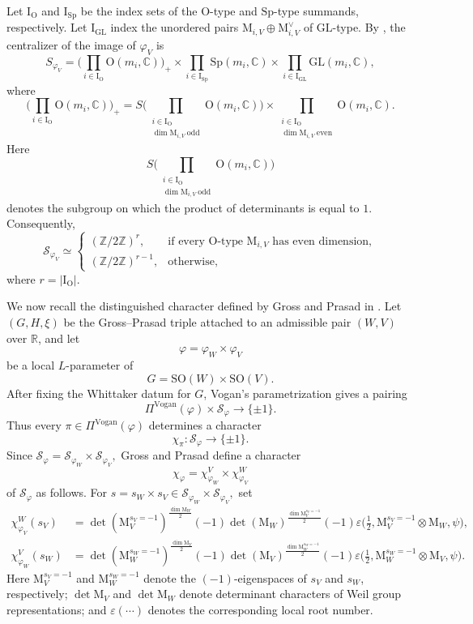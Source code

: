 \documentclass[12pt]{amsart}
\numberwithin{equation}{subsection}
\newcommand{\BC}{{\mathbb {C}}}
\newcommand{\BR}{{\mathbb {R}}}
\newcommand{\BZ}{{\mathbb {Z}}}
\newcommand{\CS}{{\mathcal {S}}}
\newcommand{\RI}{{\mathrm {I}}}
\newcommand{\RM}{{\mathrm {M}}}
\newcommand{\RO}{{\mathrm {O}}}
\newcommand{\GL}{{\mathrm{GL}}}
\newcommand{\SO}{{\mathrm{SO}}}
\newcommand{\Sp}{{\mathrm{Sp}}}
\def\veps{{\varepsilon}}
\def\vphi{\varphi}
\def\Vg{\mathrm{Vogan}}
\def\SO{\mathrm{SO}}
\begin{document}
Let $\RI_\RO$ and $\RI_\Sp$ be the index sets of the $\RO$-type and
$\Sp$-type summands, respectively. Let $\RI_\GL$ index the unordered pairs
$\RM_{i,V}\oplus \RM_{i,V}^\vee$ of $\GL$-type. By
\cite[Prop.~6.6, Prop.~7.7]{MR1186476}, the centralizer of the image of
$\vphi_V$ is
\begin{equation}\label{eq:SvphiVdescription}
S_{\vphi_V}
=
\bigg(
\prod_{i\in \RI_\RO}\RO(m_i,\BC)
\bigg)_+
\times
\prod_{i\in \RI_\Sp}\Sp(m_i,\BC)
\times
\prod_{i\in \RI_\GL}\GL(m_i,\BC),
\end{equation}
where
\[
\bigg(
\prod_{i\in \RI_\RO}\RO(m_i,\BC)
\bigg)_+
=
S\bigg(
\prod_{\substack{i\in \RI_\RO\\ \dim \RM_{i,V}\ \mathrm{odd}}}
\RO(m_i,\BC)
\bigg)
\times
\prod_{\substack{i\in \RI_\RO\\ \dim \RM_{i,V}\ \mathrm{even}}}
\RO(m_i,\BC).
\]
Here
\[
S\bigg(
\prod_{\substack{i\in \RI_\RO\\ \dim \RM_{i,V}\ \mathrm{odd}}}
\RO(m_i,\BC)
\bigg)
\]
denotes the subgroup on which the product of determinants is equal to $1$.
Consequently,
\begin{equation}\label{eq:component}
\CS_{\vphi_V}
\simeq
\begin{cases}
(\BZ/2\BZ)^r,
& \text{if every $\RO$-type $\RM_{i,V}$ has even dimension},\\
(\BZ/2\BZ)^{r-1},
& \text{otherwise},
\end{cases}
\end{equation}
where $r=|\RI_\RO|$.

We now recall the distinguished character defined by Gross and Prasad in
\cite[\S 10]{MR1186476}. Let $(G,H,\xi)$ be the Gross--Prasad triple attached
to an admissible pair $(W,V)$ over $\BR$, and let
\[
\vphi=\vphi_W\times \vphi_V
\]
be a local $L$-parameter of
\[
G=\SO(W)\times \SO(V).
\]
After fixing the Whittaker datum for $G$, Vogan's parametrization gives a
pairing
\[
\Pi^{\Vg}(\vphi)\times \CS_\vphi\to \{\pm 1\}.
\]
Thus every $\pi\in \Pi^{\Vg}(\vphi)$ determines a character
\[
\chi_\pi:\CS_\vphi\to \{\pm 1\}.
\]
Since
$
\CS_\vphi=\CS_{\vphi_W}\times \CS_{\vphi_V},
$
Gross and Prasad define a character
\[
\chi_\vphi=\chi^V_{\vphi_W}\times \chi^W_{\vphi_V}
\]
of $\CS_\vphi$ as follows. For
$
s=s_W\times s_V\in \CS_{\vphi_W}\times \CS_{\vphi_V},
$
set
\begin{align}\label{eq:chivphicharacter:1}
\chi^W_{\vphi_V}(s_V)
&=
\det(\RM_V^{s_V=-1})^{\frac{\dim \RM_W}{2}}(-1)
\det(\RM_W)^{\frac{\dim \RM_V^{s_V=-1}}{2}}(-1)
\veps\bigg(\frac{1}{2},\RM_V^{s_V=-1}\otimes \RM_W,\psi\bigg),
\\
\chi^V_{\vphi_W}(s_W)
&=
\det(\RM_W^{s_W=-1})^{\frac{\dim \RM_V}{2}}(-1)
\det(\RM_V)^{\frac{\dim \RM_W^{s_W=-1}}{2}}(-1)
\veps\bigg(\frac{1}{2},\RM_W^{s_W=-1}\otimes \RM_V,\psi\bigg).
\nonumber
\end{align}
Here $\RM_V^{s_V=-1}$ and $\RM_W^{s_W=-1}$ denote the $(-1)$-eigenspaces of
$s_V$ and $s_W$, respectively; $\det \RM_V$ and $\det \RM_W$ denote determinant
characters of Weil group representations; and $\veps(\cdots)$ denotes the
corresponding local root number.
\end{document}
